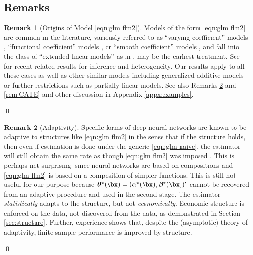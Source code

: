 \documentclass[12pt]{article}
\numberwithin{equation}{section}
\theoremstyle{definition}
\newtheorem{remarkTmp}{Remark}
\newenvironment{remark}
	{\medskip  \begin{remarkTmp} 	}
	{ 
		\renewcommand{\qedsymbol}{$\clubsuit$}
		\qed 
		\end{remarkTmp} 
	}
\newcommand{\btheta}{\boldsymbol{\theta}}
\newcommand{\bbeta}{\boldsymbol{\beta}}
\newcommand{\bttrue}{\btheta^\star}
\newcommand{\atrue}{\alpha^\star}
\newcommand{\bbtrue}{\bbeta^\star}
\begin{document}
\begin{appendices}
\subsection{Remarks}




\begin{remark}[Origins of Model \eqref{eqn:glm flm2}]
    \label{rem:model origins}
    Models of the form \eqref{eqn:glm flm2} are common in the literature, variously referred to as ``varying coefficient'' models \citep{Cleveland-Grosse-Shyu1991_BookChap,Hastie-Tibshirani1993_JRSSB}, ``functional coefficient'' models \citep{Chen-Tsay1993_JASA}, or ``smooth coefficient'' models \citep{Li-etal2002_JBES}, and fall into the class of ``extended linear models'' as in \cite{Stone-Hansen-Kooperberg-Truong1997_AoS}. \cite{OHagan1978_JRSSB} may be the earliest treatment. See \cite{Vansteelandt-Dukes2022_JRSSB} for recent related results for inference and heterogeneity. Our results apply to all these cases as well as other similar models including generalized additive models or further restrictions such as partially linear models. See also Remarks \ref{rem:adaptivity} and \ref{rem:CATE} and other discussion in Appendix \ref{appx:examples}.
\end{remark}



\begin{remark}[Adaptivity]
    \label{rem:adaptivity}
    Specific forms of deep neural networks are known to be adaptive to structures like \eqref{eqn:glm flm2} in the sense that if the structure holds, then even if estimation is done under the generic \eqref{eqn:glm naive}, the estimator will still obtain the same rate as though \eqref{eqn:glm flm2} was imposed \citep{Bach2017_JMLR,Bauer-Kohler2019_AoS,Schmidt-Hieber2020_AoS,Kohler-Krzyzak-Langer2022_IEEE,Fan-Gu2024_JASA,Fan-Jana-Kulkarni-Yin2025_WP}. This is perhaps not surprising, since neural networks are based on compositions and \eqref{eqn:glm flm2} is based on a composition of simpler functions. This is still not useful for our purpose because $\bttrue(\bx) = (\atrue(\bx), \bbtrue(\bx))'$ cannot be recovered from an adaptive procedure and used in the second stage. The estimator \emph{statistically} adapts to the structure, but not \emph{economically}. Economic structure is enforced on the data, not discovered from the data, as demonstrated in Section \ref{sec:structure}. Further, experience shows that, despite the (asymptotic) theory of adaptivity, finite sample performance is improved by structure.
\end{remark} 




\end{appendices}
\end{document}
